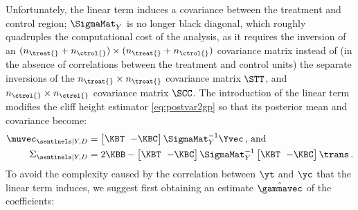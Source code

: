 Unfortunately, the linear term induces a covariance between the treatment and control region; \(\SigmaMat_Y\) is no longer black diagonal, which roughly quadruples the computational cost of the analysis, as it requires the inversion of an \((n_\treat{}+n_\ctrol{}) \times (n_\treat{}+n_\ctrol{})\) covariance matrix instead of (in the absence of correlations between the treatment and control units) the separate inversions of the \(n_\treat{} \times n_\treat{}\) covariance matrix \(\STT\), and \(n_\ctrol{} \times n_\ctrol{}\) covariance matrix \(\SCC\).
The introduction of the linear term modifies the cliff height estimator \autoref{eq:postvar2gp} so that its posterior mean and covariance become:
\begin{equation}
    \begin{split}
        \muvec_{\sentinels \mid Y, D} &= 
        \begingroup\SmallColSep
        \begin{bmatrix}
            \KBT & -\KBC
        \end{bmatrix}
        \SigmaMat_Y^{-1}
        \Yvec
        \endgroup
        \,\text{, and}\\
        \Sigma_{\sentinels \mid Y, D} &=
        \begingroup\SmallColSep
        2 \KBB -
        \begin{bmatrix}
            \KBT & -\KBC
        \end{bmatrix}
        \SigmaMat_Y^{-1}
        \begin{bmatrix}
            \KBT & -\KBC
        \end{bmatrix}\trans
        \endgroup
        \,.
    \end{split}
    \label{eq:cliff_with_covariates}
\end{equation}
To avoid the complexity caused by the correlation between \(\yt\) and \(\yc\) that the linear term induces, we suggest first obtaining an estimate \(\hat\gammavec\) of the coefficients:
